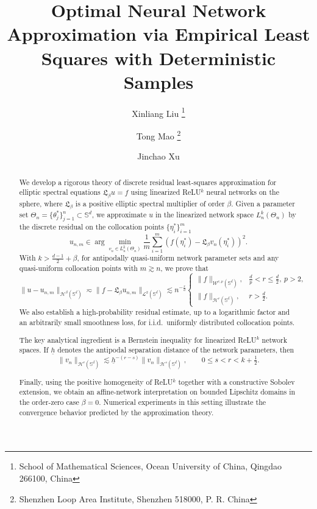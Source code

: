 \documentclass{article}
\title{Optimal Neural Network Approximation via Empirical Least Squares with Deterministic Samples}
\author{ Xinliang Liu \thanks{School of Mathematical Sciences, Ocean University of China, Qingdao 266100, China}   \and
  Tong Mao \thanks{Shenzhen Loop Area Institute, Shenzhen 518000, P. R. China} \and
  Jinchao Xu\footnotemark[2]
}
\date{}
\numberwithin{equation}{section}
\begin{document}
	
\maketitle

\begin{abstract}
We develop a rigorous theory of discrete residual least-squares approximation for elliptic spectral equations $\mathfrak L_\beta u=f$ using linearized ReLU$^k$ neural networks on the sphere, where $\mathfrak L_\beta$ is a positive elliptic spectral multiplier of order $\beta$. Given a parameter set $\Theta_n=\{\theta_{j}^*\}_{j=1}^n\subset\mathbb S^d$, we approximate $u$ in the linearized network space $L_n^k(\Theta_n)$ by the discrete residual on the collocation points $\{\eta_i^*\}_{i=1}^m$
\begin{equation*}
u_{n,m}\in\arg\min_{v_n\in L_n^k(\Theta_n)}\frac1m\sum_{i=1}^m\left(f(\eta_i^*)-\mathfrak L_\beta v_n(\eta_i^*)\right)^2.
\end{equation*}
With $k>\frac{d-1}{2}+\beta$, for antipodally quasi-uniform network parameter sets and any quasi-uniform collocation points with $m\gtrsim n$, we prove that
\begin{equation*}
\|u-u_{n,m}\|_{\mathcal H^{\beta}(\mathbb S^d)}\eqsim\|f-\mathfrak L_\beta u_{n,m}\|_{\mathcal L^2(\mathbb S^d)}\lesssim n^{-\frac{r}{d}}
\begin{cases}
\|f\|_{\mathcal W^{r,p}(\mathbb S^d)},&\frac{d}{p}<r\leq \frac{d}{2},~p>2,\\
\|f\|_{\mathcal H^r(\mathbb S^d)},&r>\frac{d}{2}.
\end{cases}
\end{equation*}
We also establish a high-probability residual estimate, up to a logarithmic factor and an arbitrarily small smoothness loss, for i.i.d.\ uniformly
distributed collocation points.

The key analytical ingredient is a Bernstein inequality for linearized ReLU$^k$ network spaces. If $\underline h$ denotes the antipodal separation distance of the network parameters, then
\begin{equation*}
\|v_n\|_{\mathcal H^r(\mathbb S^d)}\lesssim\underline h^{-(r-s)}\|v_n\|_{\mathcal H^s(\mathbb S^d)},\qquad 0\leq s<r<k+\tfrac12.
\end{equation*}

Finally, using the positive homogeneity of ReLU$^k$ together with a constructive Sobolev extension, we obtain an affine-network interpretation on bounded Lipschitz domains in the order-zero case $\beta=0$. Numerical experiments in this setting illustrate the convergence behavior predicted by the approximation theory.
\end{abstract}
\end{document}
